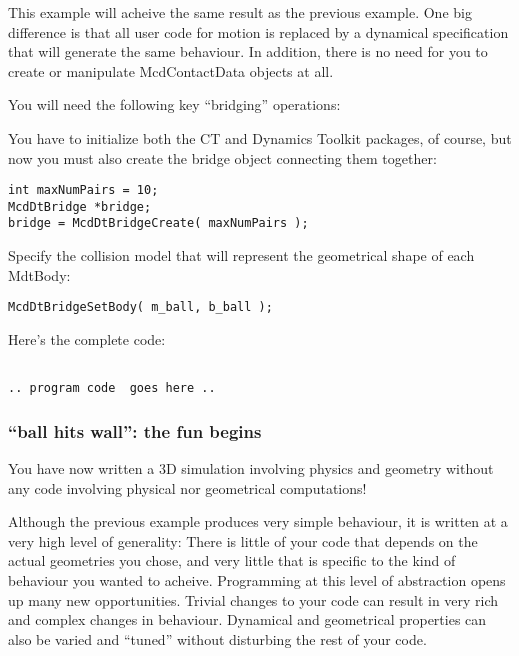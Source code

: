 \documentclass[11pt]{article}
\newcommand{\minisection}[1]{\noindent{\bf{#1}}}
\begin{document}
This example will acheive the same result as the previous example. One big 
difference is that all user code for motion is replaced by a dynamical
specification that will generate the same behaviour. In addition, there is
no need for you to create or manipulate McdContactData objects at all. 


You will need the following key ``bridging'' operations:

\minisection{Begin:}


You have to initialize both the CT and Dynamics Toolkit packages, of course, but now you
must also create the bridge object connecting them together:

\begin{verbatim}
int maxNumPairs = 10;
McdDtBridge *bridge;
bridge = McdDtBridgeCreate( maxNumPairs );
\end{verbatim}

\minisection{Giving shape to MdtBody's:}

Specify the collision model that will represent the geometrical shape of
each MdtBody: 

\begin{verbatim}
McdDtBridgeSetBody( m_ball, b_ball );
\end{verbatim}

Here's the complete code:

\begin{verbatim}

.. program code  goes here ..

\end{verbatim}


\subsubsection{ ``ball hits wall'': the fun begins }

You have now written a 3D simulation involving physics and geometry
without any code involving physical nor geometrical computations!

Although the previous example produces very simple behaviour, it is written
at a very high level of generality: There is little of your code that
depends on the actual geometries you chose, and very little that is
specific to the kind of behaviour you wanted to acheive.  Programming at
this level of abstraction opens up many new opportunities.  Trivial changes
to your code can result in very rich and complex changes in
behaviour. Dynamical and geometrical properties can also be varied and
``tuned'' without disturbing the rest of your code.
\end{document}
